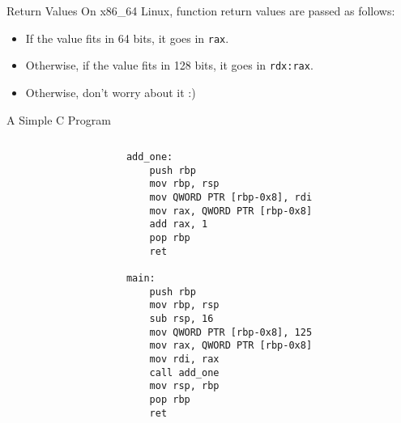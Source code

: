 \documentclass[hyphens,aspectratio=169]{beamer}
\begin{document}
\begin{frame}[fragile]{Return Values}
    On x86\_64 Linux, function return values are passed as follows:
    \begin{itemize}
        \pause \item If the value fits in 64 bits, it goes in \texttt{rax}.
        \pause \item Otherwise, if the value fits in 128 bits, it goes in \texttt{rdx:rax}.
        \pause \item Otherwise, don't worry about it :)
    \end{itemize}
\end{frame}

\begin{frame}[fragile]{A Simple C Program}
    \begin{columns}
        \begin{column}{0.5\textwidth}
            \inputminted[fontsize=\tiny,escapeinside=||]{c}{add_one.c}
        \end{column}
        \begin{column}{0.5\textwidth}
            \begin{verbatim}
add_one:
    push rbp
    mov rbp, rsp
    mov QWORD PTR [rbp-0x8], rdi
    mov rax, QWORD PTR [rbp-0x8]
    add rax, 1
    pop rbp
    ret

main:
    push rbp
    mov rbp, rsp
    sub rsp, 16
    mov QWORD PTR [rbp-0x8], 125
    mov rax, QWORD PTR [rbp-0x8]
    mov rdi, rax
    call add_one
    mov rsp, rbp
    pop rbp
    ret
            \end{verbatim}
        \end{column}
    \end{columns}
\end{frame}
\end{document}
